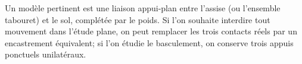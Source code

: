\begin{corrigebox}
Un modèle pertinent est une liaison appui-plan entre l'assise (ou l'ensemble tabouret) et le sol, complétée par le poids. Si l'on souhaite interdire tout mouvement dans l'étude plane, on peut remplacer les trois contacts réels par un encastrement équivalent; si l'on étudie le basculement, on conserve trois appuis ponctuels unilatéraux.
\end{corrigebox}

